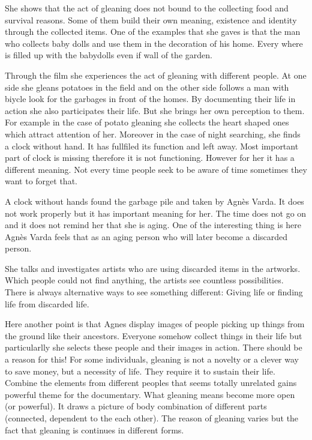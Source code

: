 
She shows that the act of gleaning does not bound to the collecting food and survival reasons. Some of them build their own meaning, existence and identity through the collected items. One of the examples that she gaves is that the man who collects baby dolls and use them in the decoration of his home. Every where is filled up with the babydolls even if wall of the garden.

Through the film she experiences the act of gleaning with different people. At one side she gleans potatoes in the field and on the other side follows a man with biycle look for the garbages in front of the homes. By documenting their life in action she also participates their life. But she brings her own perception to them. For example in the case of potato gleaning she collects the heart shaped ones which attract attention of her. Moreover in the case of night searching, she finds a clock without hand. It has fullfiled its function and left away. Most important part of clock is missing therefore it is not functioning. However for her it has a different meaning. Not every time people seek to be aware of time sometimes they want to forget that.

A clock without hands found the garbage pile and taken by Agnès Varda. It does not work properly but it has important meaning for her. The time does not go on and it does not remind her that she is aging. One of the interesting thing is here Agnès Varda feels that as an aging person who will later become a discarded person.

She talks and investigates artists who are using discarded items in the artworks. Which people could not find anything, the artists see countless possibilities. There is always alternative ways to see something different: Giving life or finding life from discarded life. 

Here another point is that Agnes display images of people picking up things from the ground like their ancestors. Everyone somehow collect things in their life but particularlly she selects these people and their images in action. There should be a reason for this! For some individuals, gleaning is not a novelty or a clever way to save money, but a necessity of life. They require it to sustain their life. Combine the elements from different peoples that seems totally unrelated gains powerful theme for the documentary. What gleaning means become more open (or powerful). It draws a picture of body combination of different parts (connected, dependent to the each other). The reason of gleaning varies but the fact that gleaning is continues in different forms.

